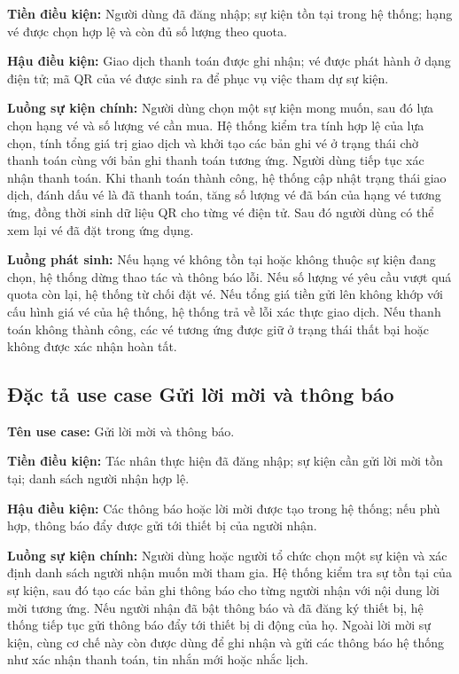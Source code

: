 \documentclass[../DoAn.tex]{subfiles}
\begin{document}
\textbf{Tiền điều kiện:} Người dùng đã đăng nhập; sự kiện tồn tại trong hệ thống; hạng vé được chọn hợp lệ và còn đủ số lượng theo quota.

\textbf{Hậu điều kiện:} Giao dịch thanh toán được ghi nhận; vé được phát hành ở dạng điện tử; mã \gls{QR} của vé được sinh ra để phục vụ việc tham dự sự kiện.

\textbf{Luồng sự kiện chính:}
Người dùng chọn một sự kiện mong muốn, sau đó lựa chọn hạng vé và số lượng vé cần mua. Hệ thống kiểm tra tính hợp lệ của lựa chọn, tính tổng giá trị giao dịch và khởi tạo các bản ghi vé ở trạng thái chờ thanh toán cùng với bản ghi thanh toán tương ứng. Người dùng tiếp tục xác nhận thanh toán. Khi thanh toán thành công, hệ thống cập nhật trạng thái giao dịch, đánh dấu vé là đã thanh toán, tăng số lượng vé đã bán của hạng vé tương ứng, đồng thời sinh dữ liệu \gls{QR} cho từng vé điện tử. Sau đó người dùng có thể xem lại vé đã đặt trong ứng dụng.

\textbf{Luồng phát sinh:}
Nếu hạng vé không tồn tại hoặc không thuộc sự kiện đang chọn, hệ thống dừng thao tác và thông báo lỗi. Nếu số lượng vé yêu cầu vượt quá quota còn lại, hệ thống từ chối đặt vé. Nếu tổng giá tiền gửi lên không khớp với cấu hình giá vé của hệ thống, hệ thống trả về lỗi xác thực giao dịch. Nếu thanh toán không thành công, các vé tương ứng được giữ ở trạng thái thất bại hoặc không được xác nhận hoàn tất.

\subsection{Đặc tả use case Gửi lời mời và thông báo}
\textbf{Tên use case:} Gửi lời mời và thông báo.

\textbf{Tiền điều kiện:} Tác nhân thực hiện đã đăng nhập; sự kiện cần gửi lời mời tồn tại; danh sách người nhận hợp lệ.

\textbf{Hậu điều kiện:} Các thông báo hoặc lời mời được tạo trong hệ thống; nếu phù hợp, thông báo đẩy được gửi tới thiết bị của người nhận.

\textbf{Luồng sự kiện chính:}
Người dùng hoặc người tổ chức chọn một sự kiện và xác định danh sách người nhận muốn mời tham gia. Hệ thống kiểm tra sự tồn tại của sự kiện, sau đó tạo các bản ghi thông báo cho từng người nhận với nội dung lời mời tương ứng. Nếu người nhận đã bật thông báo và đã đăng ký thiết bị, hệ thống tiếp tục gửi thông báo đẩy tới thiết bị di động của họ. Ngoài lời mời sự kiện, cùng cơ chế này còn được dùng để ghi nhận và gửi các thông báo hệ thống như xác nhận thanh toán, tin nhắn mới hoặc nhắc lịch.
\end{document}

